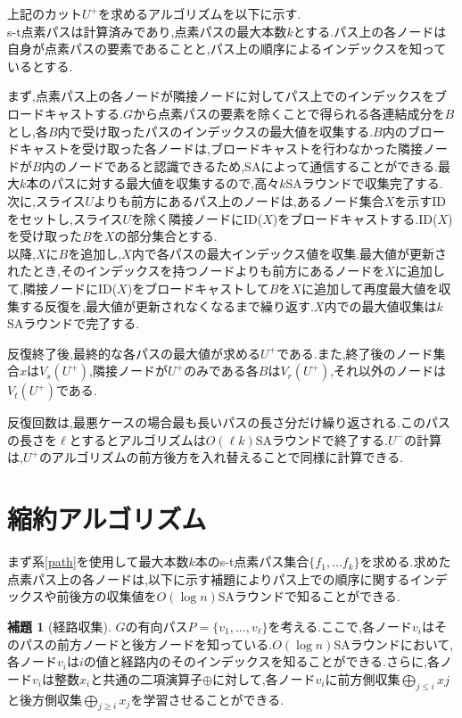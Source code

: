 \documentclass{thesis}
\theoremstyle{definition}
\newtheorem{lemma}{補題}
\begin{document}
上記のカット$U^+$を求めるアルゴリズムを以下に示す.\\
s-t点素パスは計算済みであり,点素パスの最大本数$k$とする.パス上の各ノードは自身が点素パスの要素であることと,パス上の順序によるインデックスを知っているとする.\par
まず,点素パス上の各ノードが隣接ノードに対してパス上でのインデックスをブロードキャストする.$G$から点素パスの要素を除くことで得られる各連結成分を$B$とし,各$B$内で受け取ったパスのインデックスの最大値を収集する.$B$内のブロードキャストを受け取った各ノードは,ブロードキャストを行わなかった隣接ノードが$B$内のノードであると認識できるため,SAによって通信することができる.最大$k$本のパスに対する最大値を収集するので,高々$k$SAラウンドで収集完了する.\\
次に,スライス$U$よりも前方にあるパス上のノードは,あるノード集合$X$を示すIDをセットし,スライス$U$を除く隣接ノードにID($X$)をブロードキャストする.ID($X$)を受け取った$B$を$X$の部分集合とする.\\
以降,$X$に$B$を追加し,$X$内で各パスの最大インデックス値を収集.最大値が更新されたとき,そのインデックスを持つノードよりも前方にあるノードを$X$に追加して,隣接ノードにID($X$)をブロードキャストして$B$を$X$に追加して再度最大値を収集する反復を,最大値が更新されなくなるまで繰り返す.$X$内での最大値収集は$k$SAラウンドで完了する.\par
反復終了後,最終的な各パスの最大値が求める$U^+$である.また,終了後のノード集合$x$は$V_s(U^+)$,隣接ノードが$U^+$のみである各$B$は$V_r(U^+)$,それ以外のノードは$V_t(U^+)$である.\par
反復回数は,最悪ケースの場合最も長いパスの長さ分だけ繰り返される.このパスの長さを$\ell$とするとアルゴリズムは$O(\ell k)$SAラウンドで終了する.$U^-$の計算は,$U^+$のアルゴリズムの前方後方を入れ替えることで同様に計算できる.

\section{縮約アルゴリズム}


まず系\ref{path}を使用して最大本数$k$本のs-t点素パス集合$\{f_1, \dots f_k\}$を求める.求めた点素パス上の各ノードは,以下に示す補題によりパス上での順序に関するインデックスや前後方の収集値を$O(\log n)$SAラウンドで知ることができる.

\begin{lemma}[経路収集\cite{li2018distributed}]
    $G$の有向パス$P = \{v_1,...,v_\ell\}$を考える.ここで,各ノード$v_i$はそのパスの前方ノードと後方ノードを知っている.$O(\log n)$SAラウンドにおいて,各ノード$v_i$は$i$の値と経路内のそのインデックスを知ることができる.さらに,各ノード$v_i$は整数$x_i$と共通の二項演算子$\oplus$に対して,各ノード$v_i$に前方側収集$\bigoplus_{j\leq i}xj$と後方側収集$\bigoplus_{j\geq i}x_j$を学習させることができる.
  \end{lemma}
\end{document}
